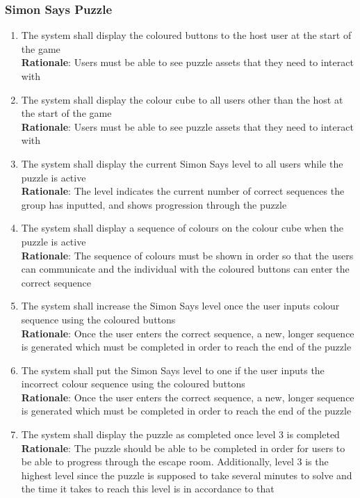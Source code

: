 \documentclass[12pt]{article}
\begin{document}
\subsubsection{Simon Says Puzzle}
    \begin{enumerate}[label=SS\arabic*., series=SimonSays]
        \item The system shall display the coloured buttons to the host user at the start of the game\\
        \textbf{Rationale}: Users must be able to see puzzle assets that they need to interact with
        \item The system shall display the colour cube to all users other than the host at the start of the game\\
        \textbf{Rationale}: Users must be able to see puzzle assets that they need to interact with
        \item The system shall display the current Simon Says level to all users while the puzzle is active\\
        \textbf{Rationale}: The level indicates the current number of correct sequences the group has inputted, and shows progression through the puzzle
        \item The system shall display a sequence of colours on the colour cube when the puzzle is active\\
        \textbf{Rationale}: The sequence of colours must be shown in order so that the users can communicate and the individual with the coloured buttons can enter the correct sequence
        \item The system shall increase the Simon Says level once the user inputs colour sequence using the coloured buttons\\
        \textbf{Rationale}: Once the user enters the correct sequence, a new, longer sequence is generated which must be completed in order to reach the end of the puzzle
        \item The system shall put the Simon Says level to one if the user inputs the incorrect colour sequence using the coloured buttons\\
        \textbf{Rationale}: Once the user enters the correct sequence, a new, longer sequence is generated which must be completed in order to reach the end of the puzzle
        \item The system shall display the puzzle as completed once level 3 is completed\\
        \textbf{Rationale}: The puzzle should be able to be completed in order for users to be able to progress through the escape room. Additionally, level 3 is the highest level since the puzzle is supposed to take several minutes to solve and the time it takes to reach this level is in accordance to that
    \end{enumerate}
\end{document}
